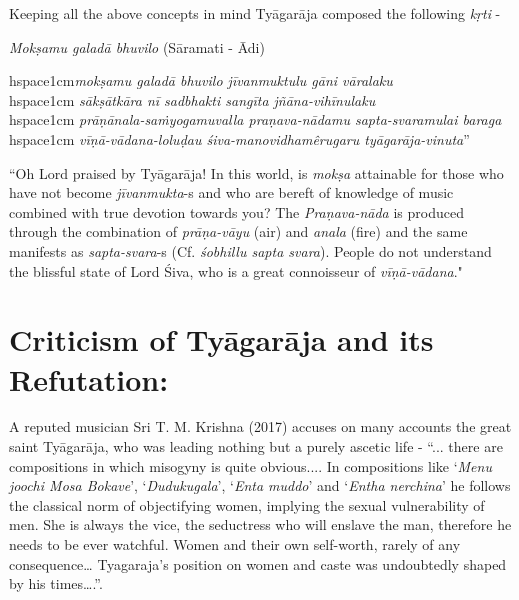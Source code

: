 Keeping all the above concepts in mind Tyāgarāja composed the following \textit{kṛti} -

\textit{Mokṣamu galadā bhuvilo} (Sāramati - Ādi)

\begin{myquote}
hspace{1cm}\textit{mokṣamu galadā bhuvilo jīvanmuktulu gāni vāralaku}\\hspace{1cm} \textit{sākṣātkāra nī sadbhakti sangīta jñāna-vihīnulaku}\\hspace{1cm} \textit{prāṇānala-saṁyogamuvalla praṇava-nādamu sapta-svaramulai baraga}\\hspace{1cm} \textit{vīṇā-vādana-loluḍau śiva-manovidhamêrugaru tyāgarāja-vinuta}”
\end{myquote}

``Oh Lord praised by Tyāgarāja! In this world, is \textit{mokṣa} attainable for those who have not become \textit{jīvanmukta}-s and who are bereft of knowledge of music combined with true devotion towards you? The \textit{Praṇava-nāda} is produced through the combination of \textit{prāṇa-vāyu} (air) and \textit{anala} (fire) and the same manifests as \textit{sapta-svara}-s (Cf. \textit{śobhillu sapta svara}). People do not understand the blissful state of Lord Śiva, who is a great connoisseur of \textit{vīṇā-vādana}."


\section*{Criticism of Tyāgarāja and its Refutation:}

A reputed musician Sri T. M. Krishna (2017) accuses on many accounts the great saint Tyāgarāja, who was leading nothing but a purely ascetic life - “... there are compositions in which misogyny is quite obvious.... In compositions like ‘\textit{Menu joochi Mosa Bokave}’, ‘\textit{Dudukugala}’, ‘\textit{Enta muddo}’ and ‘\textit{Entha nerchina}’ he follows the classical norm of objectifying women, implying the sexual vulnerability of men. She is always the vice, the seductress who will enslave the man, therefore he needs to be ever watchful. Women and their own self-worth, rarely of any consequence… Tyagaraja’s position on women and caste was undoubtedly shaped by his times….”.

